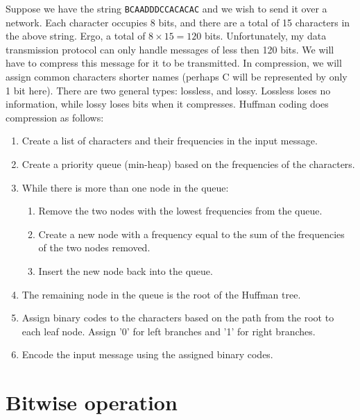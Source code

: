 \documentclass[nobib]{tufte-handout}
\begin{document}
Suppose we have the string \texttt{BCAADDDCCACACAC} and we wish 
to send it over a network. Each character occupies 8 bits, and there 
are a total of 15 characters in the above string. Ergo, 
a total of $8 \times 15 = 120$ bits. 
Unfortunately, my data transmission protocol can only handle 
messages of less then 120 bits. We will have to compress this message 
for it to be transmitted. 
In compression, we will assign common characters shorter names 
(perhaps C will be represented by only 1 bit here). There 
are two general types: lossless, and lossy. Lossless loses no 
information, while lossy loses bits when it compresses. 
Huffman coding does compression as follows: 
\begin{enumerate}
   \item Create a list of characters and their frequencies in the input message.
   \item Create a priority queue (min-heap) based on the frequencies of the characters.
   \item While there is more than one node in the queue:
   \begin{enumerate}
      \item Remove the two nodes with the lowest frequencies from the queue.
      \item Create a new node with a frequency equal to the sum of the frequencies of the two nodes removed.
      \item Insert the new node back into the queue.
   \end{enumerate}
   \item The remaining node in the queue is the root of the Huffman tree.
   \item Assign binary codes to the characters based on the path from the root to each leaf node. Assign '0' for left branches and '1' for right branches.
   \item Encode the input message using the assigned binary codes.
\end{enumerate}

\section{Bitwise operation}
\end{document}
